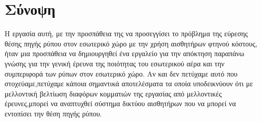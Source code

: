 \section{Σύνοψη}

Η εργασία αυτή, με την προσπάθεια της να προσεγγίσει το πρόβλημα της εύρεσης
θέσης πηγής ρύπου στον εσωτερικό χώρο με την χρήση αισθητήρων φτηνού κόστους,
ήταν μια προσπάθεια να δημιουργηθεί ένα εργαλείο για την απόκτηση παραπάνω
γνώσης για την γενική έρευνα της ποιότητας του εσωτερικού αέρα και την συμπεριφορά
των ρύπων στον εσωτερικό χώρο. Αν και δεν πετύχαμε αυτό που στοχεύαμε,πετύχαμε
κάποια σημαντικά αποτελέσματα τα οποία υποδεικνύουν ότι με μελλοντική βελτίωση
διαφόρων κομματιών της εργασίας από μελλοντικές έρευνες,μπορεί να αναπτυχθεί
σύστημα δικτύου αισθητήρων που να μπορεί να εντοπίσει την θέση πηγής ρύπου.